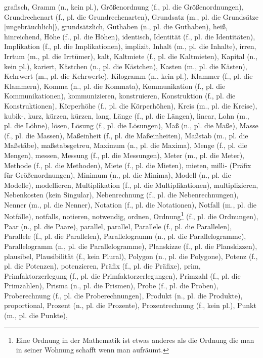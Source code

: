 grafisch,
Gramm (n., kein pl.),
Größenordnung (f., pl. die Größenordnungen),
Grundrechenart (f., pl. die Grundrechenarten),
Grundsatz (m., pl. die Grundsätze [ungebräuchlich]),
grundsätzlich,
Guthaben (n., pl. die Guthaben),
heiß,
hinreichend,
Höhe (f., pl. die Höhen),
identisch,
Identität (f., pl. die Identitäten),
Implikation (f., pl. die Implikationen),
implizit,
Inhalt (m., pl. die Inhalte),
irren,
Irrtum (m., pl. die Irrtümer),
kalt,
Kaltmiete (f., pl. die Kaltmieten),
Kapital (n., kein pl.),
kariert,
Kästchen (n., pl. die Kästchen),
Kasten (m., pl. die Kästen),
Kehrwert (m., pl. die Kehrwerte),
Kilogramm (n., kein pl.),
Klammer (f., pl. die Klammern),
Komma (n., pl. die Kommata),
Kommunikation (f., pl. die Kommunikationen),
kommunizieren,
konstruieren,
Konstruktion (f., pl. die Konstruktionen),
Körperhöhe (f., pl. die Körperhöhen),
Kreis (m., pl. die Kreise),
kubik-,
kurz,
kürzen,
kürzen,
lang,
Länge (f., pl. die Längen),
linear,
Lohn (m., pl. die Löhne),
lösen,
Lösung (f., pl. die Lösungen),
Maß (n., pl. die Maße),
Masse (f., pl. die Massen),
Maßeinheit (f., pl. die Maßeinheiten),
Maßstab (m., pl. die Maßstäbe),
maßstabsgetreu,
Maximum (n., pl. die Maxima),
Menge (f., pl. die Mengen),
messen,
Messung (f., pl. die Messungen),
Meter (m., pl. die Meter),
Methode (f., pl. die Methoden),
Miete (f., pl. die Mieten),
mieten,
milli- (Präfix für Größenordnungen),
Minimum (n., pl. die Minima),
Modell (n., pl. die Modelle),
modellieren,
Multiplikation (f., pl. die Multiplikationen),
multiplizieren,
Nebenkosten (kein Singular),
Nebenrechnung (f., pl. die Nebenrechnungen),
Nenner (m., pl. die Nenner),
Notation (f., pl. die Notationen),
Notfall (m., pl. die Notfälle),
notfalls,
notieren,
notwendig,
ordnen,
Ordnung\footnote{Eine Ordnung in der Mathematik ist etwas anderes als die Ordnung die man in seiner Wohnung schafft wenn man aufräumt.} (f., pl. die Ordnungen),
Paar (n., pl. die Paare),
parallel,
parallel,
Parallele (f., pl. die Parallelen),
Parallele (f., pl. die Parallelen),
Parallelogramm (n., pl. die Parallelogramme),
Parallelogramm (n., pl. die Parallelogramme),
Planskizze (f., pl. die Planskizzen),
plausibel,
Plausibilität (f., kein Plural),
Polygon (n., pl. die Polygone),
Potenz (f., pl. die Potenzen),
potenzieren,
Präfix (f., pl. die Präfixe),
prim,
Primfaktorzerlegung (f., pl. die Primfaktorzerlegungen),
Primzahl (f., pl. die Primzahlen),
Prisma (n., pl. die Prismen),
Probe (f., pl. die Proben),
Proberechnung (f., pl. die Proberechnungen),
Produkt (n., pl. die Produkte),
proportional,
Prozent (n., pl. die Prozente),
Prozentrechnung (f., kein pl.),
Punkt (m., pl. die Punkte),
